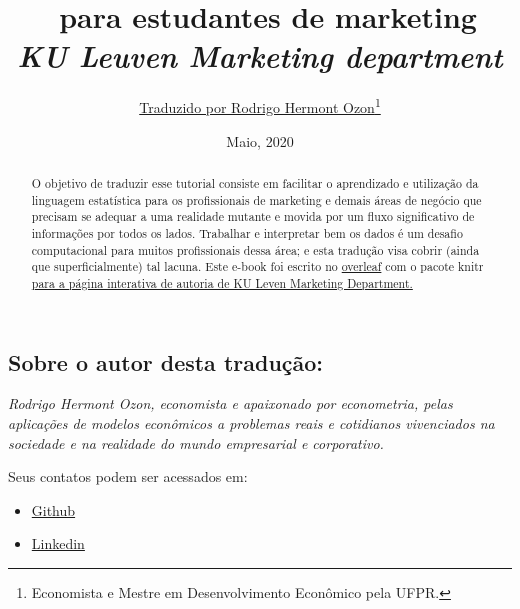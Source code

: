 \documentclass{article}
\newcommand{\roundpic}[4][]{
  \tikz\node [circle, minimum width = #2,
    path picture = {
      \node [#1] at (path picture bounding box.center) {
        \texttt{[image: \#4]}};
    }] {};}
\begin{document}

\title{\faRProject~para estudantes de marketing \\\textit{KU Leuven Marketing department}}
\author{\href{https://rhozon.github.io/}{Traduzido por Rodrigo Hermont Ozon\footnote{Economista e Mestre em Desenvolvimento Econômico pela UFPR.}}}
\date{Maio, 2020}

\maketitle



\thispagestyle{empty}
\newpage

\begin{mdframed}[style=MyFrame]

\fbox{%
\roundpic[xshift=-.00000095cm,yshift=-.0006cm]{3.8cm}{3cm}{me.jpg}%
}


\section*{Sobre o autor desta tradução:}


\textit{Rodrigo Hermont Ozon, economista e apaixonado por econometria, pelas aplicações de modelos econômicos a problemas reais e cotidianos vivenciados na sociedade e na realidade do mundo empresarial e corporativo.}


\begin{flushleft}
Seus contatos podem ser acessados em:

\begin{itemize}
\item \href{https://rhozon.github.io/}{\faGithub} \href{https://rhozon.github.io/}{Github}

\item \href{https://www.linkedin.com/in/rodrigohermontozon/}{\faLinkedin} \href{https://www.linkedin.com/in/rodrigohermontozon/}{Linkedin} %
\end{itemize}
\end{flushleft}


\end{mdframed}

\vspace{9cm}


\begin{abstract}
  O objetivo de traduzir esse tutorial consiste em facilitar o aprendizado e utilização da linguagem estatística \faRProject para os profissionais de marketing e demais áreas de negócio que precisam se adequar a uma realidade mutante e movida por um fluxo significativo de informações por todos os lados. Trabalhar e interpretar bem os dados é um desafio computacional para muitos profissionais dessa área; e esta tradução visa cobrir (ainda que superficialmente) tal lacuna.
  Este e-book foi escrito no \href{http://www.overleaf.com}{overleaf} com o pacote knitr \href{https://bookdown.org/content/1340/}{para a página interativa de autoria de KU Leven Marketing Department.}
\end{abstract}
\end{document}
